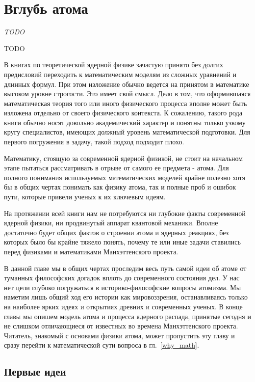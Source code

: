 \chapter{Вглубь атома}

\epigraph{\emph{TODO}}
{TODO}

В книгах по теоретической ядерной физике зачастую принято без долгих предисловий переходить к математическим моделям из сложных уравнений и длинных формул.
При этом изложение обычно ведется на принятом в математике высоком уровне строгости.
Это имеет свой смысл.
Дело в том, что оформившаяся математическая теория того или иного физического процесса вполне может быть изложена отдельно от своего физического контекста.
К сожалению, такого рода книги обычно носят довольно академический характер и понятны только узкому кругу специалистов, имеющих должный уровень математической подготовки. Для первого погружения в задачу, такой подход подходит плохо.

Математику, стоящую за современной ядерной физикой, не стоит на начальном этапе пытаться рассматривать в отрыве от самого ее предмета - атома.
Для полного понимания используемых математических моделей крайне полезно хотя бы в общих чертах понимать как физику атома, так и полные проб и ошибок пути, которые привели ученых к их ключевым идеям.
  
На протяжении всей книги нам не потребуются ни глубокие факты современной ядерной физики, ни продвинутый аппарат квантовой механики.
Вполне достаточно будет общих фактов о строении атома и ядерных реакциях, без которых было бы крайне тяжело понять, почему те или иные задачи ставились перед физиками и математиками Манхэттенского проекта.

В данной главе мы в общих чертах проследим весь путь самой идеи об атоме от туманных философских догадок вплоть до современного состояния дел. 
У нас нет цели глубоко погружаться в историко-философские вопросы атомизма.
Мы наметим лишь общий ход его истории как мировоззрения, останавливаясь только на наиболее ярких идеях и открытиях древних и современных ученых.
В конце главы мы опишем модель атома и процесса ядерного распада, принятые сегодня и не слишком отличающиеся от известных во времена Манхэттенского проекта.
Читатель, знакомый с основами физики атома, может пропустить эту главу и сразу перейти к математической сути вопроса в гл.~\ref{why_math}.

\section*{Первые идеи}

